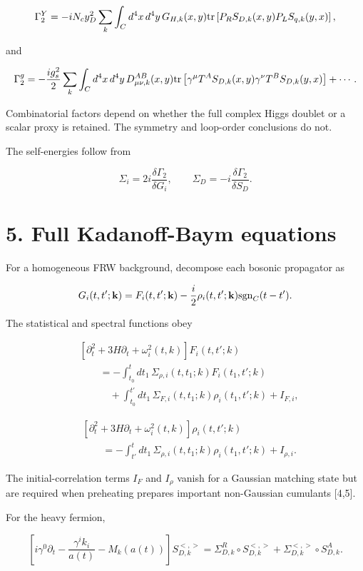\documentclass[
  10pt,
]{article}
\begin{document}
\[
\Gamma_2^{Y}
=
-iN_cy_D^2\sum_k\int_Cd^4x\,d^4y\,
G_{H,k}(x,y)
{\rm tr}\left[
P_RS_{D,k}(x,y)P_LS_{q,k}(y,x)
\right],
\]

and

\[
\Gamma_2^{g}
=
-\frac{ig_s^2}{2}\sum_k\int_Cd^4x\,d^4y\,
D^{AB}_{\mu\nu,k}(x,y)
{\rm tr}\left[
\gamma^\mu T^AS_{D,k}(x,y)
\gamma^\nu T^BS_{D,k}(y,x)
\right]
+\cdots.
\]

Combinatorial factors depend on whether the full complex Higgs doublet
or a scalar proxy is retained. The symmetry and loop-order conclusions
do not.

The self-energies follow from

\[
\Sigma_i=2i\frac{\delta\Gamma_2}{\delta G_i},
\qquad
\Sigma_D=-i\frac{\delta\Gamma_2}{\delta S_D}.
\]

\section{5. Full Kadanoff-Baym
equations}\label{full-kadanoff-baym-equations}

For a homogeneous FRW background, decompose each bosonic propagator as

\[
G_i(t,t';\mathbf k)
=
F_i(t,t';\mathbf k)
-\frac i2\rho_i(t,t';\mathbf k)
{\rm sgn}_C(t-t').
\]

The statistical and spectral functions obey

\[
\begin{aligned}
&\left[\partial_t^2+3H\partial_t+\omega_i^2(t,k)\right]
F_i(t,t';k)
\\
&\qquad=
-\int_{t_0}^{t}dt_1\,
\Sigma_{\rho,i}(t,t_1;k)F_i(t_1,t';k)
\\
&\qquad\quad+
\int_{t_0}^{t'}dt_1\,
\Sigma_{F,i}(t,t_1;k)\rho_i(t_1,t';k)
+I_{F,i},
\end{aligned}
\]

\[
\begin{aligned}
&\left[\partial_t^2+3H\partial_t+\omega_i^2(t,k)\right]
\rho_i(t,t';k)
\\
&\qquad=
-\int_{t'}^{t}dt_1\,
\Sigma_{\rho,i}(t,t_1;k)\rho_i(t_1,t';k)
+I_{\rho,i}.
\end{aligned}
\]

The initial-correlation terms \(I_F\) and \(I_\rho\) vanish for a
Gaussian matching state but are required when preheating prepares
important non-Gaussian cumulants {[}4,5{]}.

For the heavy fermion,

\[
\left[
i\gamma^0\partial_t
-\frac{\gamma^i k_i}{a(t)}
-M_k(a(t))
\right]S_{D,k}^{<,>}
=
\Sigma_{D,k}^{R}\circ S_{D,k}^{<,>}
+
\Sigma_{D,k}^{<,>}\circ S_{D,k}^{A}.
\]
\end{document}
